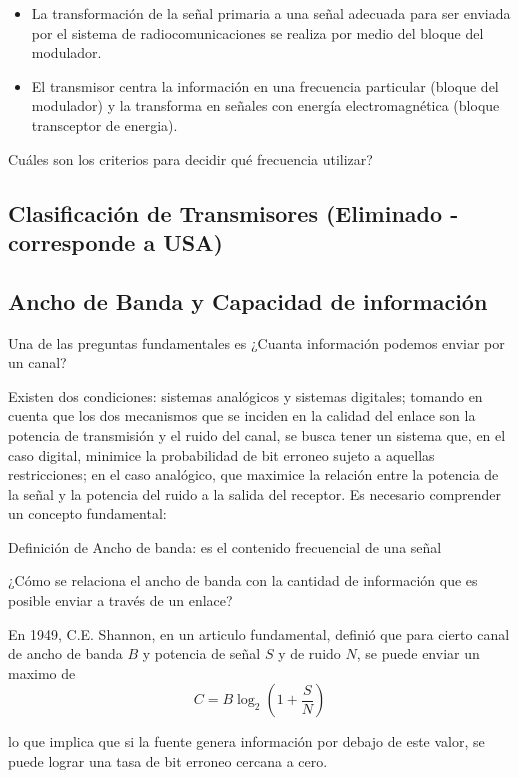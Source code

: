 \documentclass[12pt,letterpaper,titlepage,twoside]{book}
\begin{document}
\begin{itemize}
\item La transformación de la señal primaria a una señal adecuada para ser enviada por el sistema de radiocomunicaciones se realiza por medio del bloque del modulador. 
\item El transmisor centra la información en una frecuencia particular (bloque del modulador) y la transforma en señales con energía electromagnética (bloque transceptor de energia). 
\end{itemize}

Cuáles son los criterios para decidir qué frecuencia utilizar?

\subsection{Clasificación de Transmisores (Eliminado - corresponde a USA)}



\subsection{Ancho de Banda y Capacidad de información}

Una de las preguntas fundamentales es ¿Cuanta información podemos enviar por un canal?

Existen dos condiciones: sistemas analógicos y sistemas digitales; tomando en cuenta que los dos mecanismos que se inciden en la calidad del enlace son la potencia de transmisión y el ruido del canal, se busca tener un sistema que, en el caso digital, minimice la probabilidad de bit erroneo sujeto a aquellas restricciones; en el caso analógico, que maximice la relación entre la potencia de la señal y la potencia del ruido a la salida del receptor. Es necesario comprender un concepto fundamental:

Definición de Ancho de banda: es el contenido frecuencial de una señal

¿Cómo se relaciona el ancho de banda con la cantidad de información que es posible enviar a través de un enlace?

En 1949, C.E. Shannon, en un articulo fundamental, definió que para cierto canal  de ancho de banda $B$ y potencia de señal $S$ y de ruido $N$, se puede enviar un maximo de 
\begin{equation}
C = B \log_2 \left( 1+\frac{S}{N} \right) 
\end{equation}

lo que implica que si la fuente genera información por debajo de este valor, se puede lograr una tasa de bit erroneo cercana a cero.
\end{document}
